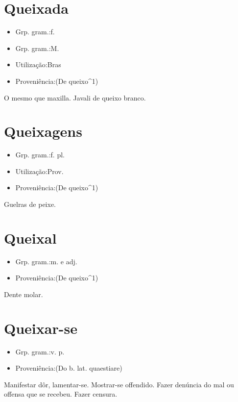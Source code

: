 \section{Queixada}
\begin{itemize}
\item {Grp. gram.:f.}
\end{itemize}
\begin{itemize}
\item {Grp. gram.:M.}
\end{itemize}
\begin{itemize}
\item {Utilização:Bras}
\end{itemize}
\begin{itemize}
\item {Proveniência:(De \textunderscore queixo\textunderscore ^1)}
\end{itemize}
O mesmo que \textunderscore maxilla\textunderscore .
Javali de queixo branco.
\section{Queixagens}
\begin{itemize}
\item {Grp. gram.:f. pl.}
\end{itemize}
\begin{itemize}
\item {Utilização:Prov.}
\end{itemize}
\begin{itemize}
\item {Proveniência:(De \textunderscore queixo\textunderscore ^1)}
\end{itemize}
Guelras de peixe.
\section{Queixal}
\begin{itemize}
\item {Grp. gram.:m.  e  adj.}
\end{itemize}
\begin{itemize}
\item {Proveniência:(De \textunderscore queixo\textunderscore ^1)}
\end{itemize}
Dente molar.
\section{Queixar-se}
\begin{itemize}
\item {Grp. gram.:v. p.}
\end{itemize}
\begin{itemize}
\item {Proveniência:(Do b. lat. \textunderscore quaestiare\textunderscore )}
\end{itemize}
Manifestar dôr, lamentar-se.
Mostrar-se offendido.
Fazer denúncia do mal ou offensa que se recebeu.
Fazer censura.
